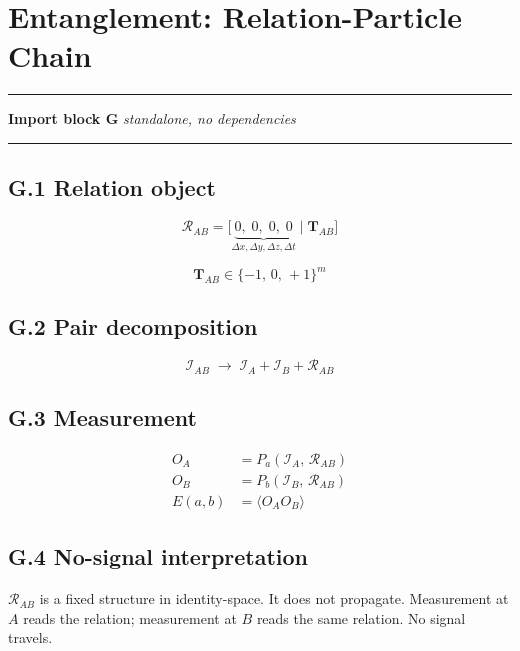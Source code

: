 \documentclass[11pt, a4paper, oneside]{article}
\theoremstyle{definition}
\theoremstyle{plain}
\theoremstyle{remark}
\begin{document}
\section{Entanglement: Relation-Particle Chain}
\label{sec:entanglement}

\noindent\rule{\linewidth}{0.8pt}
\textbf{Import block G} \hfill \textit{standalone, no dependencies}
\noindent\rule{\linewidth}{0.4pt}

\subsection*{G.1 Relation object}

\begin{equation}
  \mathcal{R}_{AB}
  = \bigl[\underbrace{0,\; 0,\; 0,\; 0}_{\Delta x,\Delta y,\Delta z,\Delta t}
	\;\big|\;
	\mathbf{T}_{AB}\bigr]
  \tag{G.1}
\end{equation}

\begin{equation}
  \mathbf{T}_{AB} \in \{-1,\, 0,\, +1\}^m
  \tag{G.2}
\end{equation}

\subsection*{G.2 Pair decomposition}

\begin{equation}
  \mathcal{I}_{AB}
  \;\to\;
  \mathcal{I}_A + \mathcal{I}_B + \mathcal{R}_{AB}
  \tag{G.3}
\end{equation}

\subsection*{G.3 Measurement}

\begin{align}
  O_A &= P_a(\mathcal{I}_A,\, \mathcal{R}_{AB}) \tag{G.4} \\
  O_B &= P_b(\mathcal{I}_B,\, \mathcal{R}_{AB}) \tag{G.5} \\
  E(a,b) &= \langle O_A O_B \rangle \tag{G.6}
\end{align}

\subsection*{G.4 No-signal interpretation}

$\mathcal{R}_{AB}$ is a fixed structure in identity-space. It does not
propagate. Measurement at $A$ reads the relation; measurement at $B$
reads the same relation. No signal travels.
\end{document}
